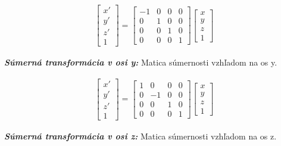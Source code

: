 \begin{equation}
\label{eq_kalib_sumer_x}
\begin{aligned}
\begin{bmatrix}
x' \\ y' \\ z' \\ 1 
\end{bmatrix}
=
\begin{bmatrix}
-1 & 0 & 0 & 0 \\
0 & 1 & 0 & 0 \\
0 & 0 & 1 & 0 \\
0 & 0 & 0 & 1 
\end{bmatrix}
\begin{bmatrix}
x \\ y \\ z \\ 1 
\end{bmatrix}
\end{aligned}
\end{equation}

\textbf{\textit{Súmerná transformácia v osi y:}} Matica súmernosti vzhľadom na os y.

\begin{equation}
\label{eq_kalib_sumer_y}
\begin{aligned}
\begin{bmatrix}
x' \\ y' \\ z' \\ 1 
\end{bmatrix}
=
\begin{bmatrix}
1 & 0 & 0 & 0 \\
0 & -1 & 0 & 0 \\
0 & 0 & 1 & 0 \\
0 & 0 & 0 & 1 
\end{bmatrix}
\begin{bmatrix}
x \\ y \\ z \\ 1 
\end{bmatrix}
\end{aligned}
\end{equation}

\textbf{\textit{Súmerná transformácia v osi z:}} Matica súmernosti vzhľadom na os z. 

